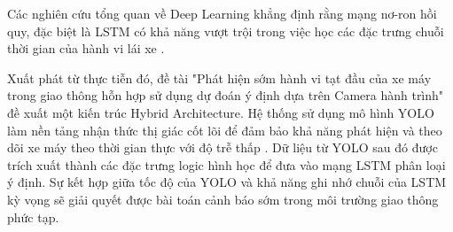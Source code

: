 	Các nghiên cứu tổng quan về Deep Learning khẳng định rằng mạng nơ-ron hồi quy, đặc biệt là LSTM có khả năng vượt trội trong việc học các đặc trưng chuỗi thời gian của hành vi lái xe \cite{Mozaffari2020DeepLV}.
	
	Xuất phát từ thực tiễn đó, đề tài "Phát hiện sớm hành vi tạt đầu của xe máy trong giao thông hỗn hợp sử dụng dự đoán ý định dựa trên Camera hành trình" đề xuất một kiến trúc Hybrid Architecture. Hệ thống sử dụng mô hình YOLO làm nền tảng nhận thức thị giác cốt lõi để đảm bảo khả năng phát hiện và theo dõi xe máy theo thời gian thực với độ trễ thấp \cite{Hidayatullah2025YOLOv8TY}. Dữ liệu từ YOLO sau đó được trích xuất thành các đặc trưng logic hình học để đưa vào mạng LSTM phân loại ý định. Sự kết hợp giữa tốc độ của YOLO và khả năng ghi nhớ chuỗi của LSTM kỳ vọng sẽ giải quyết được bài toán cảnh báo sớm trong môi trường giao thông phức tạp.
